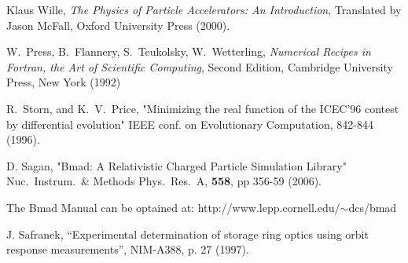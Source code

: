 \begin{thebibliography}{99}

Klaus Wille, {\em The Physics of Particle Accelerators: An Introduction},
Translated by Jason McFall, Oxford University Press (2000).

W.~Press, B.~Flannery, S.~Teukolsky, W.~Wetterling,
{\em Numerical Recipes in Fortran, the Art of Scientific Computing},
Second Edition, Cambridge University Press, New York (1992)

R.~Storn, and K.~V.~Price, "Minimizing the real function of the
ICEC'96 contest by differential evolution" IEEE conf. on Evolutionary
Computation, 842-844 (1996).

D. Sagan,
"Bmad: A Relativistic Charged Particle Simulation Library"
Nuc.\ Instrum.\ \& Methods Phys.\ Res.\ A, {\bf 558}, pp 356-59 (2006).

The Bmad Manual can be optained at:\hfill\break
\hspace*{20pt} http://www.lepp.cornell.edu/$\scriptstyle\sim$dcs/bmad

J. Safranek, ``Experimental determination of storage ring optics
using orbit response measurements'', NIM-A388, p. 27 (1997).

\end{thebibliography}
